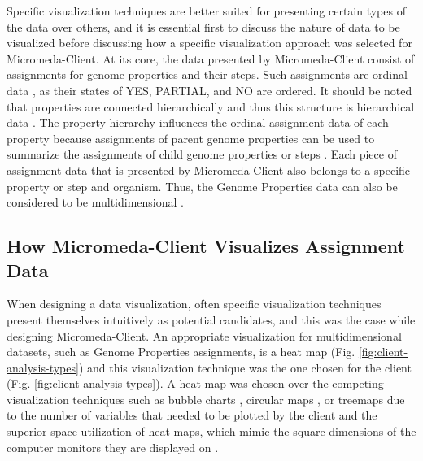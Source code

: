 Specific visualization techniques are better suited for presenting certain types 
of the data over others, and it is essential first to discuss the nature of data to 
be visualized before discussing how a specific visualization approach was 
selected for Micromeda-Client. At its core, the data presented by 
Micromeda-Client consist of assignments for genome properties and their steps. 
Such assignments are ordinal data 
\cite{richardson2018genome,agresti2010analysis}, as their states of YES, 
PARTIAL, and NO are ordered. It should be noted that properties are connected 
hierarchically \cite{richardson2018genome} and thus this structure is 
hierarchical data \cite{richardson2018genome,samet1990applications}. The 
property hierarchy influences the ordinal assignment data of each property 
because assignments of parent genome properties can be used to summarize the 
assignments of child genome properties or steps \cite{richardson2018genome}. 
Each piece of assignment data that is presented by Micromeda-Client also belongs 
to a specific property or step and organism. Thus, the Genome Properties data 
can also be considered to be multidimensional 
\cite{pedersen1999multidimensional}.

\subsection{How Micromeda-Client Visualizes Assignment Data}
\label{client-visualization}

When designing a data visualization, often specific visualization techniques 
present themselves intuitively as potential candidates, and this was the case 
while designing Micromeda-Client. An appropriate visualization for 
multidimensional datasets, such as Genome Properties assignments, is a heat map 
\cite{wilkinson2009history,tufte2001visual}(Fig. 
\ref{fig:client-analysis-types}) and this visualization technique was the one 
chosen for the client (Fig. \ref{fig:client-analysis-types}). A heat map was 
chosen over the competing visualization techniques such as bubble charts 
\cite{tufte2001visual}, circular maps 
\cite{ward2002taxonomy,stothard2004circular}, or treemaps 
\cite{shneiderman1998tree} due to the number of variables that needed to be 
plotted by the client and the superior space utilization of heat maps, which 
mimic the square dimensions of the computer monitors they are displayed on 
\cite{muramalla2017radial}.

